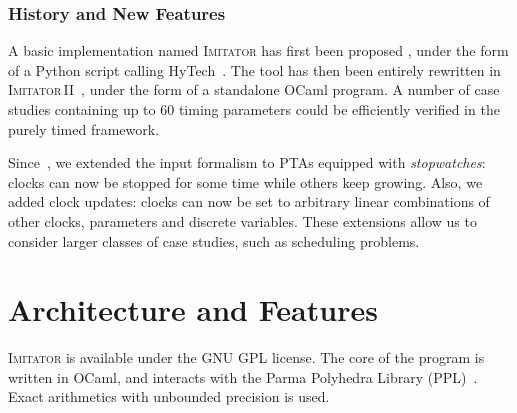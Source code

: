 \documentclass{llncs}
\newcommand{\IM}{\mathit{IM}}
\newcommand{\hytech}{{\sc HyTech}}
\newcommand{\imitator}{\textsc{Imitator}}
\newcommand{\imitatordeux}{\textsc{Imitator}\,II}
\newcommand{\ocaml}{OCaml}
\newcommand{\python}{Python}
\newcommand{\commentaire}[1]{\textcolor{red}{\textbf{$\Leftarrow$  #1 $\Rightarrow$}}}
\begin{document}
\subsubsection*{History and New Features}

A basic implementation named \imitator{} has first been proposed%
, under the form of a \python{} script calling \hytech{}~\cite{hhw97}.
The tool has then been entirely rewritten in \imitatordeux{}~\cite{and10}, under the form of a standalone \ocaml{} program. %
A number of case studies containing up to 60 timing parameters could be efficiently verified in the purely timed framework.

Since~\cite{and10}, we extended the input formalism to PTAs equipped with \emph{stopwatches}: clocks can now be stopped for some time while others keep growing.
Also, we added clock updates: clocks can now be set to arbitrary linear combinations of other clocks, parameters
and discrete variables.
These extensions allow us to consider larger classes of case studies, 
such as scheduling problems.


\section{Architecture and Features}

\imitator{} is available under the GNU GPL license.
The core of the program is written in OCaml, and interacts with the Parma Polyhedra Library (PPL)~\cite{bhz08}.
Exact arithmetics with unbounded precision is used.
\end{document}
